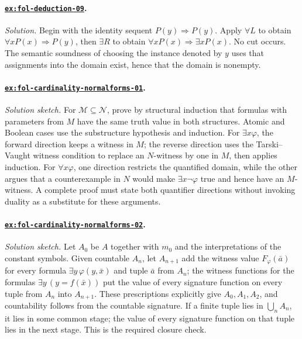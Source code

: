 \documentclass[11pt,oneside,openany]{book}
\theoremstyle{definition}
\theoremstyle{plain}
\theoremstyle{remark}
\begin{document}
\paragraph{\hyperref[ex:fol-deduction-09]{\texttt{ex:fol-deduction-09}}.}
\textit{Solution.}  Begin with the identity sequent \(P(y)\Rightarrow P(y)\).
Apply \(\forall L\) to obtain \(\forall xP(x)\Rightarrow P(y)\), then
\(\exists R\) to obtain
\(\forall xP(x)\Rightarrow\exists xP(x)\).  No cut occurs.  The semantic
soundness of choosing the instance denoted by \(y\) uses that assignments into
the domain exist, hence that the domain is nonempty.

\paragraph{\hyperref[ex:fol-cardinality-normalforms-01]{\texttt{ex:fol-cardinality-normalforms-01}}.}
\textit{Solution sketch.}  For \(\mathcal M\subseteq\mathcal N\), prove by
structural induction that formulas with parameters from \(M\) have the same
truth value in both structures.  Atomic and Boolean cases use the substructure
hypothesis and induction.  For \(\exists x\varphi\), the forward direction
keeps a witness in \(M\); the reverse direction uses the Tarski--Vaught witness
condition to replace an \(N\)-witness by one in \(M\), then applies induction.
For \(\forall x\varphi\), one direction restricts the quantified domain, while
the other argues that a counterexample in \(N\) would make
\(\exists x\neg\varphi\) true and hence have an \(M\)-witness.  A complete
proof must state both quantifier directions without invoking duality as a
substitute for these arguments.

\paragraph{\hyperref[ex:fol-cardinality-normalforms-02]{\texttt{ex:fol-cardinality-normalforms-02}}.}
\textit{Solution sketch.}  Let \(A_0\) be \(A\) together with \(m_0\)
and the interpretations of the constant symbols.  Given countable
\(A_n\), let \(A_{n+1}\) add the witness value \(F_\varphi(\bar a)\) for
every formula \(\exists y\,\varphi(y,\bar x)\) and tuple \(\bar a\) from
\(A_n\); the witness functions for the formulas
\(\exists y\,(y=f(\bar x))\) put the value of every signature function on
every tuple from \(A_n\) into \(A_{n+1}\).  These prescriptions explicitly
give \(A_0,A_1,A_2\), and countability follows from the countable signature.
If a finite tuple lies in \(\bigcup_nA_n\), it lies in some common stage; the
value of every signature function on that tuple lies in the next stage.  This
is the required closure check.
\end{document}
